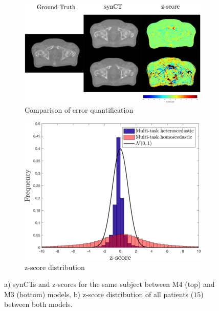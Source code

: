 \begin{figure}[!t]
  \centering
	\begin{subfigure}[]{0.7\linewidth}
		\caption{Comparison of error quantification}	
		\includegraphics[width=\linewidth]{chapter_5/figures/fig_z_1.pdf}
	\end{subfigure}
	\begin{subfigure}[]{0.6\linewidth}
		\caption{z-score distribution}
		\includegraphics[width=\linewidth]{chapter_5/figures/fig_z_2.png}
	\end{subfigure}
	\caption{a) synCTs and z-scores for the same subject between M4 (top) and M3 (bottom) models. b) z-score distribution of all patients ($15$) between both models.}
	\label{fig:diag3}
\end{figure}

